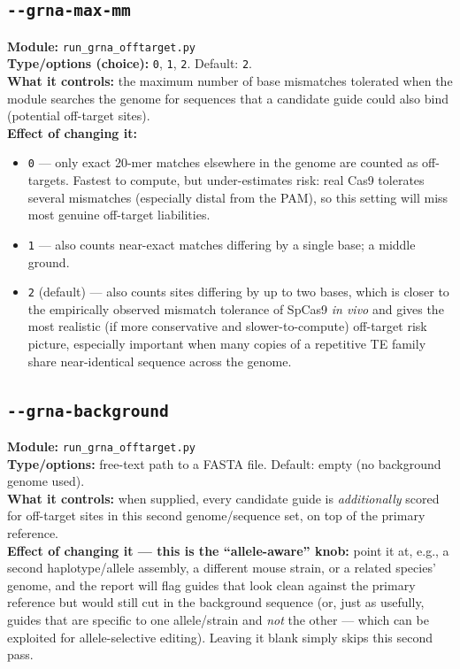 \documentclass[11pt]{article}
\newcommand{\param}[1]{\subsection*{\texttt{-\/-#1}}}
\begin{document}
\param{grna-max-mm}
\textbf{Module:} \texttt{run\_grna\_offtarget.py}\\
\textbf{Type/options (choice):} \texttt{0}, \texttt{1}, \texttt{2}. Default:
\texttt{2}.\\
\textbf{What it controls:} the maximum number of base mismatches tolerated when the
module searches the genome for sequences that a candidate guide could also bind
(potential off-target sites).\\
\textbf{Effect of changing it:}
\begin{itemize}[leftmargin=1.4em,topsep=2pt,itemsep=2pt]
  \item \texttt{0} — only exact 20-mer matches elsewhere in the genome are counted as
    off-targets. Fastest to compute, but under-estimates risk: real Cas9 tolerates
    several mismatches (especially distal from the PAM), so this setting will miss
    most genuine off-target liabilities.
  \item \texttt{1} — also counts near-exact matches differing by a single base; a
    middle ground.
  \item \texttt{2} (default) — also counts sites differing by up to two bases, which is
    closer to the empirically observed mismatch tolerance of SpCas9 \emph{in vivo} and
    gives the most realistic (if more conservative and slower-to-compute) off-target
    risk picture, especially important when many copies of a repetitive TE family share
    near-identical sequence across the genome.
\end{itemize}

\param{grna-background}
\textbf{Module:} \texttt{run\_grna\_offtarget.py}\\
\textbf{Type/options:} free-text path to a FASTA file. Default: empty (no background
genome used).\\
\textbf{What it controls:} when supplied, every candidate guide is \emph{additionally}
scored for off-target sites in this second genome/sequence set, on top of the primary
reference.\\
\textbf{Effect of changing it — this is the ``allele-aware'' knob:} point it at, e.g.,
a second haplotype/allele assembly, a different mouse strain, or a related species'
genome, and the report will flag guides that look clean against the primary reference
but would still cut in the background sequence (or, just as usefully, guides that are
specific to one allele/strain and \emph{not} the other — which can be exploited for
allele-selective editing). Leaving it blank simply skips this second pass.
\end{document}

